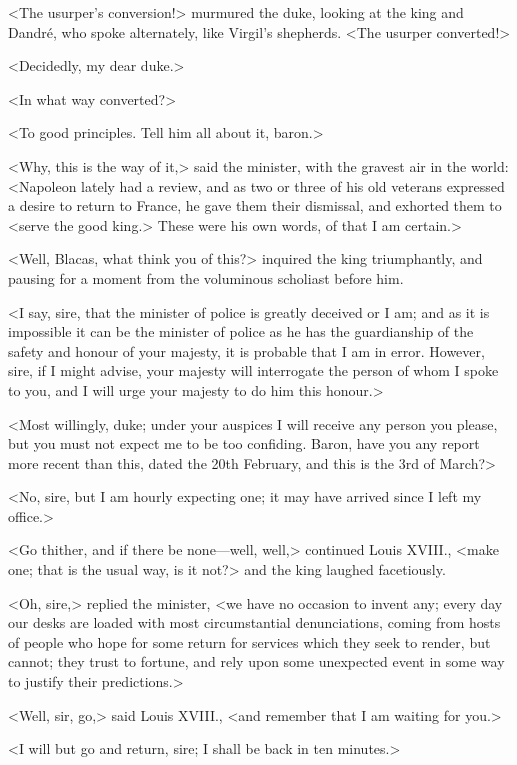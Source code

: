  <The usurper's conversion!> murmured the duke, looking at the king and Dandré, who spoke alternately, like Virgil's shepherds. <The usurper converted!> 

 <Decidedly, my dear duke.> 

 <In what way converted?> 

 <To good principles. Tell him all about it, baron.> 

 <Why, this is the way of it,> said the minister, with the gravest air in the world: <Napoleon lately had a review, and as two or three of his old veterans expressed a desire to return to France, he gave them their dismissal, and exhorted them to <serve the good king.> These were his own words, of that I am certain.> 

 <Well, Blacas, what think you of this?> inquired the king triumphantly, and pausing for a moment from the voluminous scholiast before him. 

 <I say, sire, that the minister of police is greatly deceived or I am; and as it is impossible it can be the minister of police as he has the guardianship of the safety and honour of your majesty, it is probable that I am in error. However, sire, if I might advise, your majesty will interrogate the person of whom I spoke to you, and I will urge your majesty to do him this honour.> 

 <Most willingly, duke; under your auspices I will receive any person you please, but you must not expect me to be too confiding. Baron, have you any report more recent than this, dated the 20th February, and this is the 3rd of March?> 

 <No, sire, but I am hourly expecting one; it may have arrived since I left my office.> 

 <Go thither, and if there be none—well, well,> continued Louis XVIII., <make one; that is the usual way, is it not?> and the king laughed facetiously. 

 <Oh, sire,> replied the minister, <we have no occasion to invent any; every day our desks are loaded with most circumstantial denunciations, coming from hosts of people who hope for some return for services which they seek to render, but cannot; they trust to fortune, and rely upon some unexpected event in some way to justify their predictions.> 

 <Well, sir, go,> said Louis XVIII., <and remember that I am waiting for you.> 

 <I will but go and return, sire; I shall be back in ten minutes.> 

